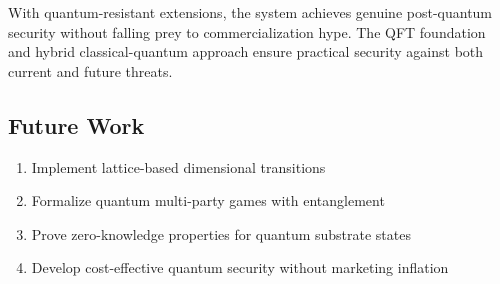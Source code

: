 \documentclass[11pt]{article}
\begin{document}
With quantum-resistant extensions, the system achieves genuine post-quantum security without falling prey to commercialization hype. The QFT foundation and hybrid classical-quantum approach ensure practical security against both current and future threats.

\subsection{Future Work}

\begin{enumerate}
    \item Implement lattice-based dimensional transitions
    \item Formalize quantum multi-party games with entanglement
    \item Prove zero-knowledge properties for quantum substrate states
    \item Develop cost-effective quantum security without marketing inflation
\end{enumerate}
\end{document}
